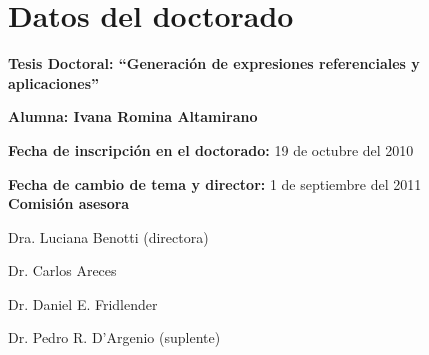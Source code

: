 \section{Datos del doctorado}
\label{datos}

{\bf Tesis Doctoral: ``Generaci\'on de expresiones referenciales y aplicaciones''}

{\bf Alumna: Ivana Romina Altamirano}

{\bf Fecha de inscripci\'on en el doctorado:} 19 de octubre del 2010

{\bf Fecha de cambio de tema y director:} 1 de septiembre del 2011\\

{\bf Comisi\'on asesora}


Dra. Luciana Benotti (directora)

Dr. Carlos Areces

Dr. Daniel E. Fridlender

Dr. Pedro R. D'Argenio (suplente)


